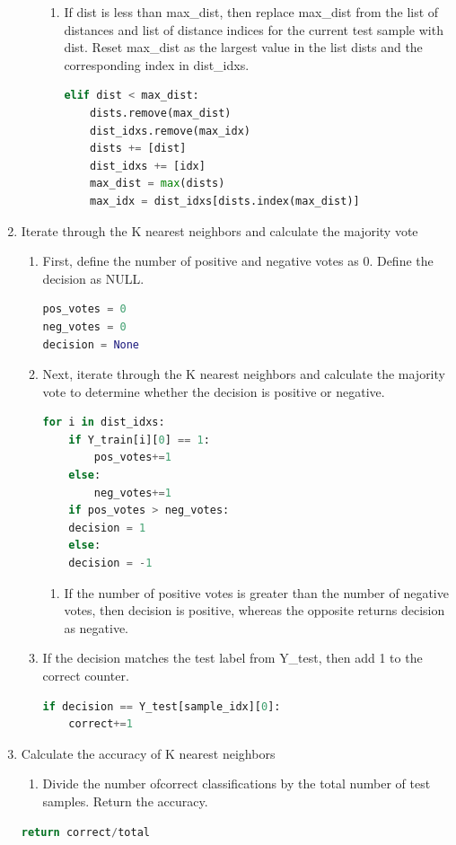 \documentclass[11pt]{article}
\theoremstyle{definition}
\begin{document}
\begin{enumerate}
\begin{enumerate}
\begin{enumerate}
    \item If \textsf{dist} is less than \textsf{max\_dist}, then replace \textsf{max\_dist} from the list of distances and list of distance indices for the current test sample with \textsf{dist}. Reset \textsf{max\_dist} as the largest value in the list \textsf{dists} and the corresponding index in \textsf{dist\_idxs}.
\begin{lstlisting}[language=python, frame=single]
elif dist < max_dist:
    dists.remove(max_dist)
    dist_idxs.remove(max_idx)
    dists += [dist]
    dist_idxs += [idx]
    max_dist = max(dists)
    max_idx = dist_idxs[dists.index(max_dist)]
    \end{lstlisting}
 \end{enumerate}
\end{enumerate}
\item Iterate through the K nearest neighbors and calculate the majority vote
 \begin{enumerate}
     \item First, define the number of positive and negative votes as 0. Define the \textsf{decision} as NULL.
\begin{lstlisting}[language = python, frame = single]
pos_votes = 0
neg_votes = 0
decision = None
\end{lstlisting}
    \item Next, iterate through the K nearest neighbors and calculate the majority vote to determine whether the \textsf{decision} is positive or negative.
\begin{lstlisting}[language=python, frame=single]
for i in dist_idxs:
    if Y_train[i][0] == 1:
        pos_votes+=1
    else:
        neg_votes+=1
    if pos_votes > neg_votes:
    decision = 1
    else:
    decision = -1
\end{lstlisting}
        \begin{enumerate}
            \item If the number of positive votes is greater than the number of negative votes, then \textsf{decision} is positive, whereas the opposite returns \textsf{decision} as negative.
        \end{enumerate}
        \item If the \textsf{decision} matches the test label from \textsf{Y\_test}, then add 1 to the \textsf{correct} counter.
\begin{lstlisting}[language=python, frame=single]
if decision == Y_test[sample_idx][0]:
    correct+=1
\end{lstlisting}
\end{enumerate}
\item Calculate the accuracy of \textsf{K} nearest neighbors
    \begin{enumerate}
        \item Divide the number of\textsf{correct} classifications by the \textsf{total} number of test samples. Return the accuracy.
    \end{enumerate}
\begin{lstlisting}[language=python, frame=single]
return correct/total
\end{lstlisting}
\end{enumerate}
\end{document}
